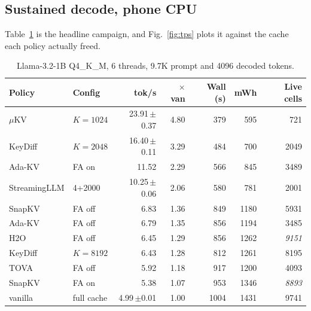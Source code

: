 \documentclass[11pt]{article}
\begin{document}
\subsection{Sustained decode, phone CPU}
Table~\ref{tab:cpu} is the headline campaign, and Fig.~\ref{fig:tps} plots it against the cache each policy actually freed.
\begin{table}[h]\centering\small
\caption{Llama-3.2-1B Q4\_K\_M, 6 threads, 9.7K prompt and 4096 decoded tokens.}
\label{tab:cpu}
\begin{tabular}{@{}llrrrrr@{}}
\toprule
\textbf{Policy} & \textbf{Config} & \textbf{tok/s} & \textbf{$\times$van} &
\textbf{Wall (s)} & \textbf{mWh} & \textbf{Live cells}\\
\midrule
\rowcolor{cA!8} $\mu$KV & $K{=}1024$ & 23.91\,$\pm$0.37 & 4.80 & 379 & 595 & 721\\
KeyDiff & $K{=}2048$ & 16.40\,$\pm$0.11 & 3.29 & 484 & 700 & 2049\\
Ada-KV & FA on & 11.52 & 2.29 & 566 & 845 & 3489\\
StreamingLLM & 4+2000 & 10.25\,$\pm$0.06 & 2.06 & 580 & 781 & 2001\\
SnapKV & FA off & 6.83 & 1.36 & 849 & 1180 & 5931\\
Ada-KV & FA off & 6.79 & 1.35 & 856 & 1194 & 3485\\
H2O & FA off & 6.45 & 1.29 & 856 & 1262 & \textit{9151}\\
KeyDiff & $K{=}8192$ & 6.43 & 1.28 & 812 & 1261 & 8195\\
TOVA & FA off & 5.92 & 1.18 & 917 & 1200 & 4093\\
SnapKV & FA on & 5.38 & 1.07 & 953 & 1346 & \textit{8893}\\
vanilla & full cache & 4.99\,$\pm$0.01 & 1.00 & 1004 & 1431 & 9741\\
\bottomrule
\end{tabular}
\end{table}
\end{document}
